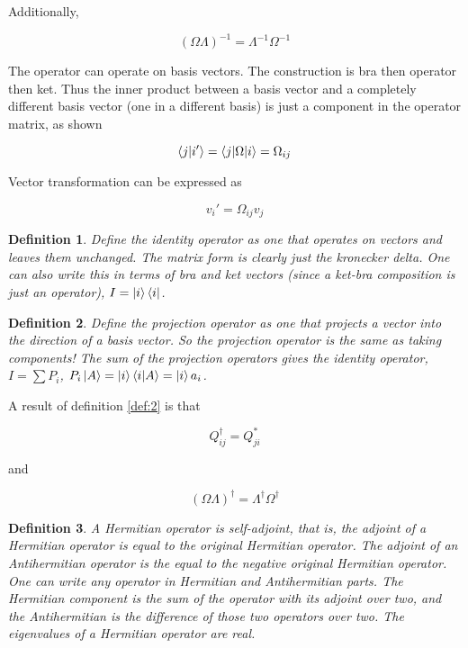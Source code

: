 \documentclass{tufte-book}
\newtheorem{definition}{Definition}
\begin{document}
Additionally,

\begin{equation}
	\label{eq:4}
	(\Omega\Lambda)^{-1} = \Lambda^{-1}\Omega^{-1}
\end{equation}

The operator can operate on basis vectors. The construction is bra then operator then ket. Thus the inner product between a basis vector and a completely different basis vector (one in a different basis) is just a component in the operator matrix, as shown

\begin{equation}
	\label{eq:5}
	\braket{j|i'} = \braket{j|\Omega|i} = \Omega_{ij}
\end{equation}

Vector transformation can be expressed as

\begin{equation}
	\label{eq:6}
	v_i' = \Omega_{ij}v_j
\end{equation}

\begin{definition}
	\label{def:8}
	Define the identity operator as one that operates on vectors and leaves them unchanged. The matrix form is clearly just the kronecker delta. One can also write this in terms of bra and ket vectors (since a ket-bra composition is just an operator), $I = \ket{i}\bra{i}$.
\end{definition}

\begin{definition}
	\label{def:9}
	Define the projection operator as one that projects a vector into the direction of a basis vector. So the projection operator is the same as taking components! The sum of the projection operators gives the identity operator, $I = \sum P_i$, $P_i\ket{A} = \ket{i}\braket{i|A} = \ket{i}a_i$.
\end{definition}

A result of definition \ref{def:2} is that

\begin{equation}
	\label{eq:7}
	Q_{ij}^{\dag} = Q_{ji}^*
\end{equation}

and

\begin{equation}
	\label{eq:8}
	(\Omega\Lambda)^{\dag} = \Lambda^{\dag}\Omega^{\dag}
\end{equation}

\begin{definition}
	\label{def:10}
	A Hermitian operator is self-adjoint, that is, the adjoint of a Hermitian operator is equal to the original Hermitian operator. The adjoint of an Antihermitian operator is the equal to the negative original Hermitian operator. One can write any operator in Hermitian and Antihermitian parts. The Hermitian component is the sum of the operator with its adjoint over two, and the Antihermitian is the difference of those two operators over two. The eigenvalues of a Hermitian operator are real.
\end{definition}
\end{document}

